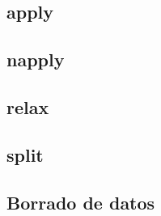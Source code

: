 \documentclass{beamer}
\begin{document}
\subsection{apply}

\subsection{napply}

\subsection{relax}

\subsection{split}

\subsection{Borrado de datos}
\end{document}
